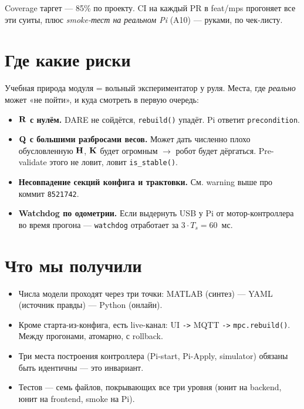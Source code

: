 Coverage таргет --- 85\% по проекту. CI на каждый PR в feat/mps
прогоняет все эти суиты, плюс \emph{smoke-тест на реальном Pi} (A10)
--- руками, по чек-листу.

\section{Где какие риски}

\begin{notebox}
Учебная природа модуля = вольный экспериментатор у руля. Места, где
\emph{реально} может «не пойти», и куда смотреть в первую очередь:

\begin{itemize}
  \item \textbf{$\mathbf{R}$ с нулём.} DARE не сойдётся, \texttt{rebuild()}
        упадёт. Pi ответит \texttt{precondition}.
  \item \textbf{$\mathbf{Q}$ с большими разбросами весов.} Может дать
        численно плохо обусловленную $\mathbf{H}$, $\mathbf{K}$ будет
        огромным $\to$ робот будет дёргаться. Pre-validate этого
        не ловит, ловит \texttt{is\_stable()}.
  \item \textbf{Несовпадение секций конфига и трактовки.} См. warning
        выше про коммит \texttt{8521742}.
  \item \textbf{Watchdog по одометрии.} Если выдернуть USB у Pi от
        мотор-контроллера во время прогона --- \texttt{watchdog}
        отработает за $3 \cdot T_s = 60$~мс.
\end{itemize}
\end{notebox}

\section{Что мы получили}

\begin{itemize}
  \item Числа модели проходят через три точки: MATLAB (синтез) ---
        YAML (источник правды) --- Python (онлайн).
  \item Кроме старта-из-конфига, есть live-канал: UI \texttt{->} MQTT
        \texttt{->} \texttt{mpc.rebuild()}. Между прогонами, атомарно,
        с rollback.
  \item Три места построения контроллера (Pi-start, Pi-Apply, simulator)
        обязаны быть идентичны --- это инвариант.
  \item Тестов --- семь файлов, покрывающих все три уровня (юнит на
        backend, юнит на frontend, smoke на Pi).
\end{itemize}

